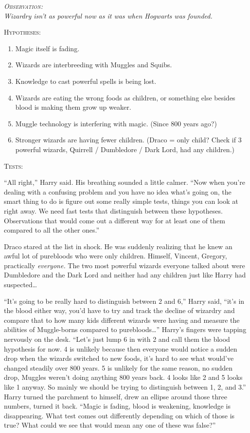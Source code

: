 \begin{center}\itshape
{\scshape Observation:}\\
Wizardry isn’t as powerful now as it was when Hogwarts was founded. 

{\scshape Hypotheses:}
\begin{enumerate}[1.]\firmlist
\item Magic itself is fading.
\item Wizards are interbreeding with Muggles and Squibs.
\item Knowledge to cast powerful spells is being lost.
\item Wizards are eating the wrong foods as children, or something else besides blood is making them grow up weaker.
\item Muggle technology is interfering with magic. (Since 800 years ago?)
\item Stronger wizards are having fewer children. (Draco = only child? Check if 3 powerful wizards, Quirrell / Dumbledore / Dark Lord, had any children.)
\end{enumerate}
{\scshape Tests:}
\end{center}

“All right,” Harry said. His breathing sounded a little calmer. “Now when you’re dealing with a confusing problem and you have no idea what’s going on, the smart thing to do is figure out some really simple tests, things you can look at right away. We need fast tests that distinguish between these hypotheses. Observations that would come out a different way for at least one of them compared to all the other ones.”

Draco stared at the list in shock. He was suddenly realizing that he knew an awful lot of purebloods who were only children. Himself, Vincent, Gregory, practically \emph{everyone.} The two most powerful wizards everyone talked about were Dumbledore and the Dark Lord and neither had any children just like Harry had suspected…

“It’s going to be really hard to distinguish between 2 and 6,” Harry said, “it’s in the blood either way, you’d have to try and track the decline of wizardry and compare that to how many kids different wizards were having and measure the abilities of Muggle-borns compared to purebloods…” Harry’s fingers were tapping nervously on the desk. “Let’s just lump 6 in with 2 and call them the blood hypothesis for now. 4 is unlikely because then everyone would notice a sudden drop when the wizards switched to new foods, it’s hard to see what would’ve changed steadily over 800 years. 5 is unlikely for the same reason, no sudden drop, Muggles weren’t doing anything 800 years back. 4 looks like 2 and 5 looks like 1 anyway. So mainly we should be trying to distinguish between 1, 2, and 3.” Harry turned the parchment to himself, drew an ellipse around those three numbers, turned it back. “Magic is fading, blood is weakening, knowledge is disappearing. What test comes out differently depending on which of those is true? What could we see that would mean any one of these was false?”

